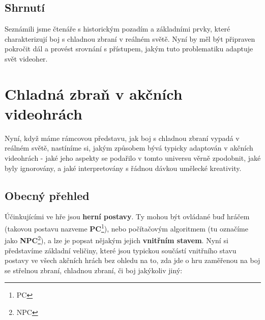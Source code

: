 \subsection*{Shrnutí}
Seznámili jsme čtenáře s historickým pozadím a základními prvky, které charakterizují boj s chladnou zbraní v reálném světě. Nyní by měl být připraven pokročit dál a provést srovnání s přístupem, jakým tuto problematiku adaptuje svět videoher.

\clearpage


\section{Chladná zbraň v akčních videohrách}

Nyní, když máme rámcovou představu, jak boj s chladnou zbraní vypadá v reálném světě, nastíníme si, jakým způsobem bývá typicky adaptován v akčních videohrách - jaké jeho aspekty se podařilo v tomto universu věrně zpodobnit, jaké byly ignorovány, a jaké interpretovány s řádnou dávkou umělecké kreativity.

\subsection{Obecný přehled}

Účinkujícími ve hře jsou \textbf{herní postavy}. Ty mohou být ovládané buď hráčem (takovou postavu nazveme \textbf{\acs{PC}}\footnote{\Acl{PC}}), nebo počítačovým algoritmem (tu označíme jako \textbf{\acs{NPC}}\footnote{\Acl{NPC}}), a lze je popsat nějakým jejich \textbf{vnitřním stavem}. Nyní si představíme základní veličiny, které jsou typickou součástí vnitřního stavu postavy ve všech akčních hrách bez ohledu na to, zda jde o hru zaměřenou na boj se střelnou zbraní, chladnou zbraní, či boj jakýkoliv jiný:


